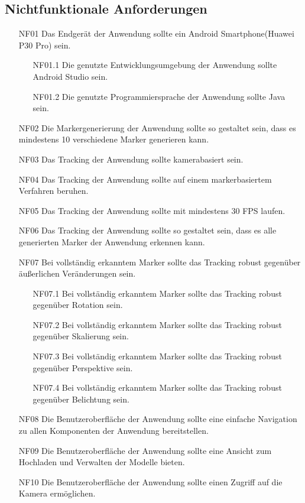 \subsection{Nichtfunktionale Anforderungen}
\begin{itemize}
\item[NF01] Das Endgerät der Anwendung sollte ein Android Smartphone(Huawei P30 Pro) sein.
\begin{enumerate}
\item[NF01.1] Die genutzte Entwicklungsumgebung der Anwendung sollte Android Studio sein.
\item[NF01.2] Die genutzte Programmiersprache der Anwendung sollte Java sein.
\end{enumerate}
\item[NF02] Die Markergenerierung der Anwendung sollte so gestaltet sein, dass es mindestens 10 verschiedene Marker generieren kann.
\item[NF03] Das Tracking der Anwendung sollte kamerabasiert sein.
\item[NF04] Das Tracking der Anwendung sollte auf einem markerbasiertem Verfahren beruhen.
\item[NF05] Das Tracking der Anwendung sollte mit mindestens 30 FPS laufen.
\item[NF06] Das Tracking der Anwendung sollte so gestaltet sein, dass es alle generierten Marker der Anwendung erkennen kann.
\item[NF07] Bei vollständig erkanntem Marker sollte das Tracking robust gegenüber äußerlichen Veränderungen sein.
\begin{enumerate}
\item[NF07.1] Bei vollständig erkanntem Marker sollte das Tracking robust gegenüber Rotation sein.
\item[NF07.2] Bei vollständig erkanntem Marker sollte das Tracking robust gegenüber Skalierung
sein.
\item[NF07.3] Bei vollständig erkanntem Marker sollte das Tracking robust gegenüber Perspektive sein.
\item[NF07.4] Bei vollständig erkanntem Marker sollte das Tracking robust gegenüber Belichtung sein.
\end{enumerate}

\item[NF08] Die Benutzeroberfläche der Anwendung sollte eine einfache Navigation zu allen Komponenten der Anwendung bereitstellen.
\item[NF09] Die Benutzeroberfläche der Anwendung sollte eine Ansicht zum Hochladen und Verwalten der Modelle bieten.
\item[NF10] Die Benutzeroberfläche der Anwendung sollte einen Zugriff auf die Kamera ermöglichen.

\end{itemize}

